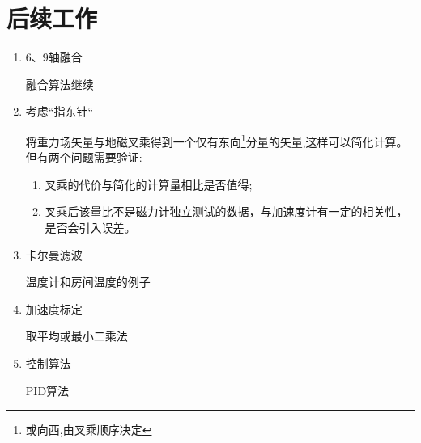 \documentclass[12pt,a4paper]{article}
\begin{document}
\section{后续工作}
\begin{enumerate}
    \item 6、9轴融合
        
        融合算法继续
    \item 考虑“指东针“

        将重力场矢量与地磁叉乘得到一个仅有东向\footnote{或向西,由叉乘顺序决定}分量的矢量,这样可以简化计算。但有两个问题需要验证:
        \begin{enumerate}
            \item 叉乘的代价与简化的计算量相比是否值得;
            \item 叉乘后该量比不是磁力计独立测试的数据，与加速度计有一定的相关性，是否会引入误差。
        \end{enumerate} 
    \item 卡尔曼滤波

        温度计和房间温度的例子
    \item 加速度标定

        取平均或最小二乘法
    \item 控制算法

        PID算法
\end{enumerate}

\newpage
\renewcommand\refname{参考文献}
\centering %


\end{document}
